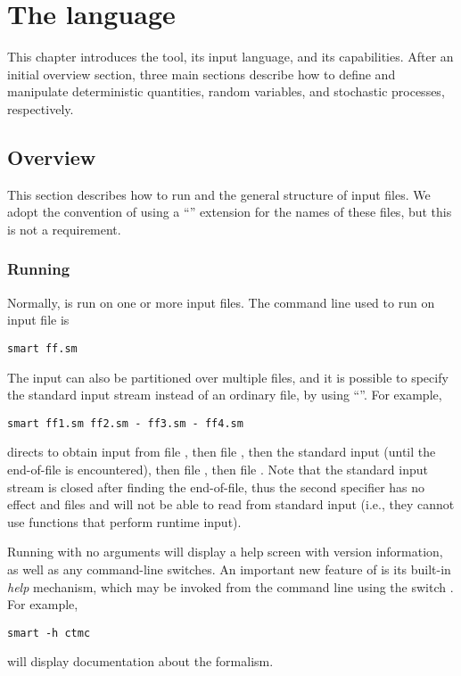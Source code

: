 % 
%

\chapter{The {\smart} language} \label{SEC:Language}

This chapter introduces the {\smart} tool, its input language, and
its capabilities.
After an initial overview section, three main sections describe
how to define and manipulate deterministic quantities, random variables,
and stochastic processes, respectively.

\section{Overview}

This section describes how to run {\smart} and the general structure of
{\smart} input files.
We adopt the convention of using a ``'' extension for the names
of these files, but this is not a requirement.

\subsection{Running {\smart}} 

Normally, {\smart} is run on one or more input files.
The command line used to run {\smart} on input file  is
\lstset{language=bash}
\begin{lstlisting}
smart ff.sm
\end{lstlisting}
The input can also be partitioned over multiple files,
and it is possible to specify the standard input stream instead
of an ordinary file, by using ``\Code{-}''.
For example,
\begin{lstlisting}
smart ff1.sm ff2.sm - ff3.sm - ff4.sm
\end{lstlisting}
directs {\smart} to obtain input from file ,
then file ,
then the standard input (until the end-of-file is encountered),
then file , then file .
Note that the standard input stream is closed after finding the end-of-file,
thus the second \Code{-} specifier has no effect and files  and
 will not be able to read from standard input
(i.e., they cannot use functions that perform runtime input).


Running {\smart} with no arguments will display a help screen with version
information, as well as any command-line switches.
An important new feature of {\smart} is its built-in \emph{help} mechanism,
which may be invoked from the command line using the switch .
For example,
\begin{lstlisting}
smart -h ctmc
\end{lstlisting}
will display documentation about the  formalism.

